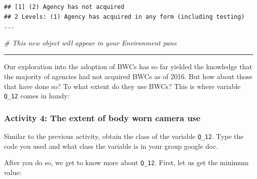 \documentclass[
]{book}
\newenvironment{Shaded}{\begin{snugshade}}{\end{snugshade}}
\newcommand{\AttributeTok}[1]{\textcolor[rgb]{0.77,0.63,0.00}{#1}}
\newcommand{\CommentTok}[1]{\textcolor[rgb]{0.56,0.35,0.01}{\textit{#1}}}
\newcommand{\ConstantTok}[1]{\textcolor[rgb]{0.00,0.00,0.00}{#1}}
\newcommand{\FunctionTok}[1]{\textcolor[rgb]{0.00,0.00,0.00}{#1}}
\newcommand{\NormalTok}[1]{#1}
\newcommand{\OtherTok}[1]{\textcolor[rgb]{0.56,0.35,0.01}{#1}}
\newcommand{\SpecialCharTok}[1]{\textcolor[rgb]{0.00,0.00,0.00}{#1}}
\begin{document}
\begin{Shaded}
\end{Shaded}

\begin{verbatim}
## [1] (2) Agency has not acquired
## 2 Levels: (1) Agency has acquired in any form (including testing) ...
\end{verbatim}

\begin{Shaded}
\begin{Highlighting}[]
\CommentTok{\# This new object will appear in your Environment pane}
\end{Highlighting}
\end{Shaded}

\begin{center}\rule{0.5\linewidth}{0.5pt}\end{center}

Our exploration into the adoption of BWCs has so far yielded the knowledge that the majority of agencies had not acquired BWCs as of 2016. But how about those that have done so? To what extent do they use BWCs? This is where variable \texttt{Q\_12} comes in handy:

\hypertarget{activity-4-the-extent-of-body-worn-camera-use}{%
\subsubsection{Activity 4: The extent of body worn camera use}\label{activity-4-the-extent-of-body-worn-camera-use}}

Similar to the previous activity, obtain the class of the variable \texttt{Q\_12}. Type the code you used and what class the variable is in your group google doc.

After you do so, we get to know more about \texttt{Q\_12}. First, let us get the minimum value:

\begin{Shaded}
\end{Shaded}
\end{document}
